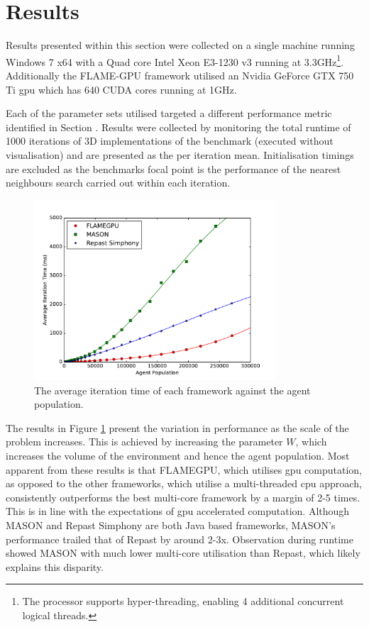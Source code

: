 \section{Results\label{sec:results}}
\vspace{-0.5cm}
  Results presented within this section were collected on a single machine running Windows 7 x64 with a Quad core Intel Xeon E3-1230 v3 running at 3.3GHz\footnote{The processor supports hyper-threading, enabling 4 additional concurrent logical threads.}. Additionally the FLAME-GPU framework utilised an Nvidia GeForce GTX 750 Ti \gls{gpu} which has 640 CUDA cores running at 1GHz.
  
  Each of the parameter sets utilised targeted a different performance metric identified in Section \label{sec:benchmark-model}. Results were collected by monitoring the total runtime of 1000 iterations of 3D implementations of the benchmark (executed without visualisation) and are presented as the per iteration mean. Initialisation timings are excluded as the benchmarks focal point is the performance of the nearest neighbours search carried out within each iteration.
  \begin{figure}[tb]
\begin{center}
    \includegraphics[width=0.8\textwidth]{../resources/problemscale_graph/graph.pdf}
    \caption{\label{fig:graph-agent-pop}The average iteration time of each framework against the agent population.}
\end{center}
\vspace{-1cm}
\end{figure}
  The results in Figure \ref{fig:graph-agent-pop} present the variation in performance as the scale of the problem increases. This is achieved by increasing the parameter $W$, which increases the volume of the environment and hence the agent population. Most apparent from these results is that FLAMEGPU, which utilises \gls{gpu} computation, as opposed to the other frameworks, which utilise a multi-threaded \gls{cpu} approach, consistently outperforms the best multi-core framework by a margin of 2-5 times. This is in line with the expectations of \gls{gpu} accelerated computation\cite{LK*10}. Although MASON and Repast Simphony are both Java based frameworks, MASON's performance trailed that of Repast by around 2-3x. Observation during runtime showed MASON with much lower multi-core utilisation than Repast, which likely explains this disparity.
